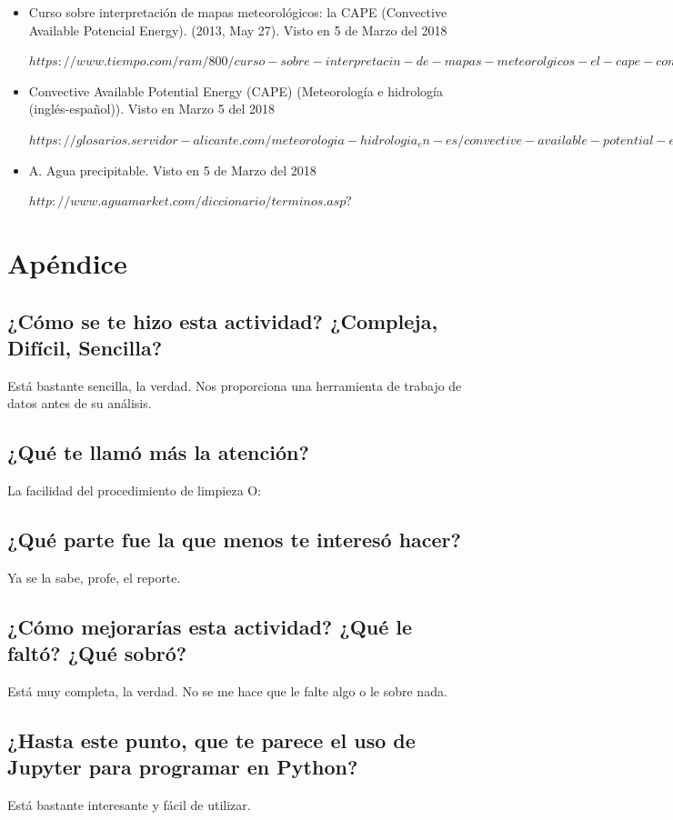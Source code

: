 \documentclass{article}
\begin{document}
\begin{itemize}
\item Curso sobre interpretación de mapas meteorológicos: la CAPE (Convective Available Potencial Energy). (2013, May 27). Visto en 5 de Marzo del 2018

$https://www.tiempo.com/ram/800/curso-sobre-interpretacin-de-mapas-meteorolgicos-el-cape-convective-available-potencial-energy/$

\item Convective Available Potential Energy (CAPE) (Meteorología e hidrología (inglés-español)). Visto en Marzo 5 del 2018

$https://glosarios.servidor-alicante.com/meteorologia-hidrologia_en-es/convective-available-potential-energy-cape$

\item A. Agua precipitable. Visto en 5 de Marzo del 2018

$http://www.aguamarket.com/diccionario/terminos.asp?$

\end{itemize}

\newpage

\section{Apéndice}
\subsection{¿Cómo se te hizo esta actividad? ¿Compleja, Difícil, Sencilla?}
Está bastante sencilla, la verdad. Nos proporciona una herramienta de trabajo de datos antes de su análisis.
\subsection{¿Qué te llamó más la atención?}
La facilidad del procedimiento de limpieza O:
\subsection{¿Qué parte fue la que menos te interesó hacer?}
Ya se la sabe, profe, el reporte.
\subsection{¿Cómo mejorarías esta actividad? ¿Qué le faltó? ¿Qué sobró?}
Está muy completa, la verdad. No se me hace que le falte algo o le sobre nada.
\subsection{¿Hasta este punto, que te parece el uso de Jupyter para programar en Python? }
Está bastante interesante y fácil de utilizar. 
\end{document}
